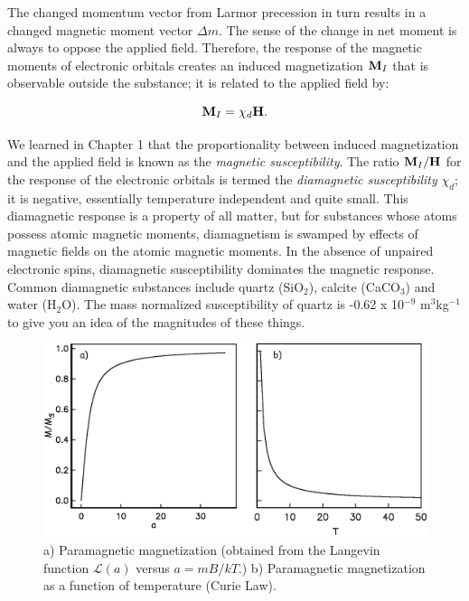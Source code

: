 { The changed momentum vector from Larmor precession  in turn results in a   changed
magnetic moment vector $\Delta m$.   The sense of the change in net moment is always to oppose the applied field.
Therefore, the response of  the magnetic moments of electronic orbitals creates an induced magnetization $\hbox{\bf M}_I$ that is observable outside
the substance;  it is related to the applied field by: 

$$
\hbox{\bf M}_I=\chi_d \hbox{\bf H}.
$$

\noindent 
We learned in Chapter 1 that the proportionality between induced magnetization and the applied field    is known as the  
%
{\it magnetic susceptibility}.
The ratio $\hbox{\bf M}_I/\hbox{\bf H} $ for the response of the electronic orbitals is  termed the 
{\it diamagnetic susceptibility\/} $\chi_d$;  it is negative, 
essentially temperature independent and quite small. This diamagnetic
response is a property of all matter, but for substances whose atoms possess atomic magnetic moments,
diamagnetism is swamped by effects of magnetic fields on the atomic magnetic moments.
  In the absence of unpaired electronic spins, diamagnetic susceptibility dominates the  magnetic response.  Common diamagnetic substances include quartz (SiO$_2$), calcite (CaCO$_3$) and water (H$_2$O).   The mass normalized susceptibility of  quartz is -0.62 x 10$^{-9}$ m$^3$kg$^{-1}$ to give you an idea of the magnitudes of  these things. 

\begin{figure}[htb]
\centering  \includegraphics[width=13.5 cm]{EPSfiles/para.eps}
\caption{a) Paramagnetic magnetization (obtained from the Langevin function $\mathcal{L}(a)$ versus $a= mB/kT$.)  b) Paramagnetic magnetization as a function of temperature (Curie Law).}
\label{fig:para}
\end{figure}


}
